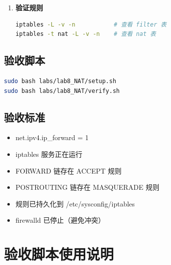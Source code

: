 \documentclass[12pt,a4paper]{ctexart}
\begin{document}
\begin{enumerate}[label=\arabic*.,leftmargin=*]
\begin{cmdbox}
\begin{lstlisting}[language=bash]
# SNAT 地址伪装
iptables -t nat -A POSTROUTING -o eth0 -j MASQUERADE

# 保存规则
iptables-save > /etc/sysconfig/iptables
  \end{lstlisting}
  \end{cmdbox}

  \item \textbf{验证规则}

  \begin{cmdbox}
  \begin{lstlisting}[language=bash]
iptables -L -v -n           # 查看 filter 表
iptables -t nat -L -v -n    # 查看 nat 表
  \end{lstlisting}
  \end{cmdbox}

\end{enumerate}

\subsection{验收脚本}

\begin{cmdbox}
\begin{lstlisting}[language=bash]
sudo bash labs/lab8_NAT/setup.sh
sudo bash labs/lab8_NAT/verify.sh
\end{lstlisting}
\end{cmdbox}

\subsection{验收标准}

\begin{itemize}
  \item net.ipv4.ip\_forward = 1
  \item iptables 服务正在运行
  \item FORWARD 链存在 ACCEPT 规则
  \item POSTROUTING 链存在 MASQUERADE 规则
  \item 规则已持久化到 /etc/sysconfig/iptables
  \item firewalld 已停止（避免冲突）
\end{itemize}

\newpage
\section{验收脚本使用说明}
\end{document}

